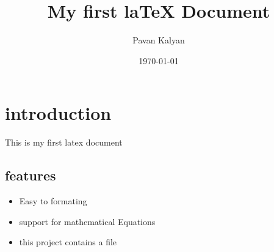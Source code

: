 \documentclass{article}
\title{My first laTeX Document}
\author{Pavan Kalyan}
\date{\today}
\begin{document}
\maketitle
\section{introduction}
This is my first latex document
\subsection{features}
\begin{itemize}
\item Easy to formating
\item support for mathematical Equations
\item this project contains a file
\end{itemize}
\end{document}
